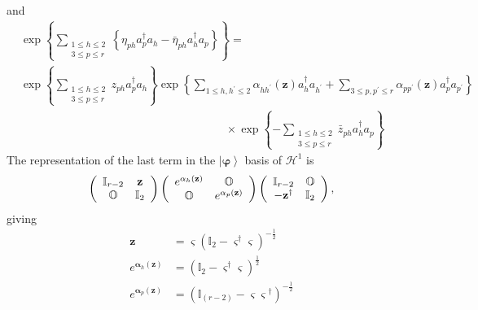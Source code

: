 \documentclass[aps,preprint]{revtex4}%
\begin{document}
and%
\begin{align}
&  \exp\left\{  \sum\limits_{\substack{1\leq h\leq2\\3\leq p\leq r}}\left\{
\eta_{ph}a_{p}^{\dagger}a_{h}-\bar{\eta}_{ph}a_{h}^{\dagger}a_{p}\right\}
\right\}  =\nonumber\\
&  \exp\left\{  \sum\limits_{\substack{1\leq h\leq2\\3\leq p\leq r}%
}z_{ph}a_{p}^{\dagger}a_{h}\right\}  \exp\left\{  \sum\limits_{1\leq
h,h^{\prime}\leq2}\alpha_{hh^{\prime}}\left(  \mathbf{z}\right)
a_{h}^{\dagger}a_{h^{\prime}}+\sum\limits_{3\leq p,p^{\prime}\leq r}%
\alpha_{pp^{\prime}}\left(  \mathbf{z}\right)  a_{p}^{\dagger}a_{p^{\prime}%
}\right\} \nonumber\\
&  \qquad\qquad\qquad\qquad\qquad\qquad\qquad\qquad\qquad\times\exp\left\{
-\sum\limits_{\substack{1\leq h\leq2\\3\leq p\leq r}}\bar{z}_{ph}%
a_{h}^{\dagger}a_{p}\right\}
\end{align}
The representation of the last term in the $\left\vert \mathbf{\varphi
}\right\rangle $ basis of $\mathcal{H}^{1}$ is
\begin{equation}
\left(
\begin{array}
[c]{cc}%
\mathbb{I}_{r-2} & \mathbf{z}\\
\mathbb{O} & \mathbb{I}_{2}%
\end{array}
\right)  \left(
\begin{array}
[c]{cc}%
e^{\mathbf{\alpha}_{h}\left(  \mathbf{z}\right)  } & \mathbb{O}\\
\mathbb{O} & e^{\mathbf{\alpha}_{p}\left(  \mathbf{z}\right)  }%
\end{array}
\right)  \left(
\begin{array}
[c]{cc}%
\mathbb{I}_{r-2} & \mathbb{O}\\
-\mathbf{z}^{\dagger} & \mathbb{I}_{2}%
\end{array}
\right)  ,
\end{equation}
giving%
\begin{align}
\mathbf{z}  &  =\mathbf{\varsigma}\left(  \mathbb{I}_{2}-\mathbf{\varsigma
}^{\dagger}\mathbf{\varsigma}\right)  ^{-\frac{1}{2}}\nonumber\\
e^{\mathbf{\alpha}_{h}\left(  \mathbf{z}\right)  }  &  =\left(  \mathbb{I}%
_{2}-\mathbf{\varsigma}^{\dagger}\mathbf{\varsigma}\right)  ^{\frac{1}{2}%
}\nonumber\\
e^{\mathbf{\alpha}_{p}\left(  \mathbf{z}\right)  }  &  =\left(  \mathbb{I}%
_{\left(  r-2\right)  }-\mathbf{\varsigma\varsigma}^{\dagger}\right)
^{-\frac{1}{2}}%
\end{align}
\end{document}
